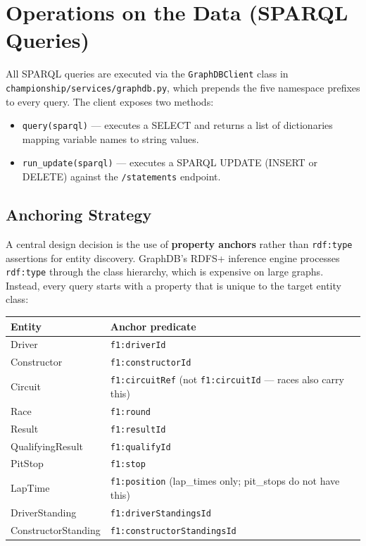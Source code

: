 \documentclass[12pt,a4paper]{article}
\begin{document}
\section{Operations on the Data (SPARQL Queries)}

All SPARQL queries are executed via the \texttt{GraphDBClient} class in
\texttt{championship/services/graphdb.py}, which prepends the five namespace
prefixes to every query. The client exposes two methods:

\begin{itemize}[leftmargin=1.5em]
  \item \texttt{query(sparql)} --- executes a SELECT and returns a list of
        dictionaries mapping variable names to string values.
  \item \texttt{run\_update(sparql)} --- executes a SPARQL UPDATE (INSERT or
        DELETE) against the \texttt{/statements} endpoint.
\end{itemize}

\subsection{Anchoring Strategy}

A central design decision is the use of \textbf{property anchors} rather than
\texttt{rdf:type} assertions for entity discovery. GraphDB's RDFS+ inference
engine processes \texttt{rdf:type} through the class hierarchy, which is
expensive on large graphs. Instead, every query starts with a property that is
unique to the target entity class:

\begin{center}
\begin{tabular}{@{}ll@{}}
\toprule
\textbf{Entity}    & \textbf{Anchor predicate} \\
\midrule
Driver             & \texttt{f1:driverId} \\
Constructor        & \texttt{f1:constructorId} \\
Circuit            & \texttt{f1:circuitRef} (not \texttt{f1:circuitId} --- races also carry this) \\
Race               & \texttt{f1:round} \\
Result             & \texttt{f1:resultId} \\
QualifyingResult   & \texttt{f1:qualifyId} \\
PitStop            & \texttt{f1:stop} \\
LapTime            & \texttt{f1:position} (lap\_times only; pit\_stops do not have this) \\
DriverStanding     & \texttt{f1:driverStandingsId} \\
ConstructorStanding & \texttt{f1:constructorStandingsId} \\
\bottomrule
\end{tabular}
\end{center}
\end{document}

